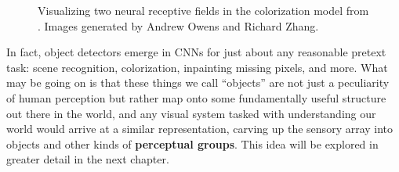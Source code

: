 \begin{figure}[h!]
{\begin{minipage}{.3\linewidth}
        \end{minipage}
        \begin{minipage}{.5\linewidth}
        \end{minipage}
    }
    \caption{Visualizing two neural receptive fields in the colorization model from \cite{zhang2016colorful}. Images generated by Andrew Owens and Richard Zhang.}
    \label{fig:representation_learning:obj_detectors_in_colorization}
\end{figure}

In fact, object detectors emerge in CNNs for just about any reasonable pretext task: scene recognition, colorization, inpainting missing pixels, and more. What may be going on is that these things we call ``objects'' are not just a peculiarity of human perception but rather map onto some fundamentally useful structure out there in the world, and any visual system tasked with understanding our world would arrive at a similar representation, carving up the sensory array into objects and other kinds of \textbf{perceptual groups}. This idea will be explored in greater detail in the next chapter. %

